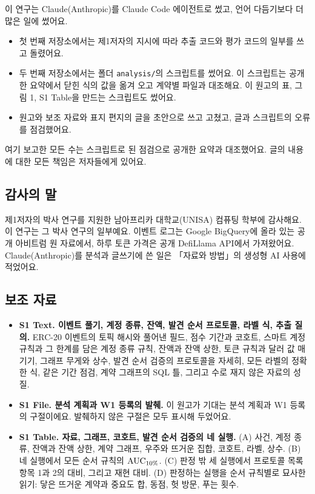 이 연구는 Claude(Anthropic)를 Claude Code 에이전트로 썼고, 언어 다듬기보다 더 많은 일에 썼어요.
\begin{itemize}
\item 첫 번째 저장소에서는 제1저자의 지시에 따라 추출 코드와 평가 코드의 일부를 쓰고 돌렸어요.
\item 두 번째 저장소에서는 폴더 \texttt{analysis/}의 스크립트를 썼어요. 이 스크립트는 공개한 요약에서 닫힌 식의 값을 옮겨 오고 계약별 파일과 대조해요. 이 원고의 표, 그림 1, S1 Table을 만드는 스크립트도 썼어요.
\item 원고와 보조 자료와 표지 편지의 글을 초안으로 쓰고 고쳤고, 글과 스크립트의 오류를 점검했어요.
\end{itemize}
여기 보고한 모든 수는 스크립트로 된 점검으로 공개한 요약과 대조했어요. 글의 내용에 대한 모든 책임은 저자들에게 있어요.

\subsection{감사의 말}

제1저자의 박사 연구를 지원한 남아프리카 대학교(UNISA) 컴퓨팅 학부에 감사해요. 이 연구는 그 박사 연구의 일부예요. 이벤트 로그는 Google BigQuery에 올라 있는 공개 아비트럼 원 자료에서, 하루 토큰 가격은 공개 DefiLlama API에서 가져왔어요. Claude(Anthropic)를 분석과 글쓰기에 쓴 일은 「자료와 방법」의 생성형 AI 사용에 적었어요.

\subsection{보조 자료}

\begin{itemize}
\item \textbf{S1 Text. 이벤트 풀기, 계정 종류, 잔액, 발견 순서 프로토콜, 라벨 식, 추출 질의.} ERC-20 이벤트의 토픽 해시와 풀어낸 필드, 점수 기간과 코호트, 스마트 계정 규칙과 그 한계를 담은 계정 종류 규칙, 잔액과 잔액 상한, 토큰 규칙과 달러 값 매기기, 그래프 무게와 상수, 발견 순서 검증의 프로토콜을 자세히, 모든 라벨의 정확한 식, 같은 기간 점검, 계약 그래프의 SQL 틀, 그리고 수로 재지 않은 자료의 성질.
\item \textbf{S1 File. 분석 계획과 W1 등록의 발췌.} 이 원고가 기대는 분석 계획과 W1 등록의 구절이에요. 발췌하지 않은 구절은 모두 표시해 두었어요.
\item \textbf{S1 Table. 자료, 그래프, 코호트, 발견 순서 검증의 네 실행.} (A) 사건, 계정 종류, 잔액과 잔액 상한, 계약 그래프, 우주와 뜨거운 집합, 코호트, 라벨, 상수. (B) 네 실행에서 모든 순서 규칙의 $\mathrm{AUC}_{10\%}$. (C) 판정 밖 세 실행에서 프로토콜 목록 항목 1과 2의 대비, 그리고 재현 대비. (D) 판정하는 실행을 순서 규칙별로 묘사한 읽기: 닿은 뜨거운 계약과 중요도 합, 동점, 헛 방문, 푸는 횟수.
\end{itemize}
